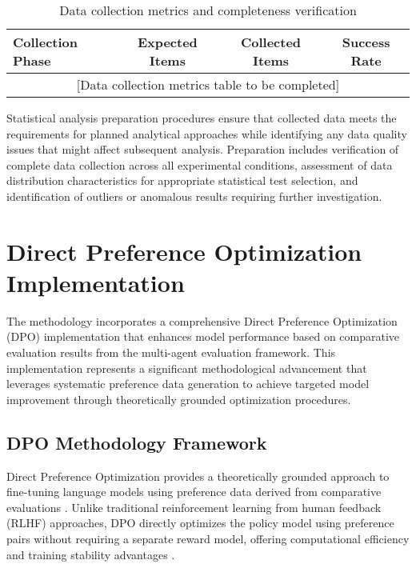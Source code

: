 \begin{table}[htbp]
    \centering
    \caption{Data collection metrics and completeness verification}
    \label{tab:data-collection-metrics}
    \begin{tabular}{|l|c|c|c|}
    \hline
    \textbf{Collection Phase} & \textbf{Expected Items} & \textbf{Collected Items} & \textbf{Success Rate} \\
    \hline
    \multicolumn{4}{|c|}{[Data collection metrics table to be completed]} \\
    \hline
    \end{tabular}
\end{table}

Statistical analysis preparation procedures ensure that collected data meets the requirements for planned analytical approaches while identifying any data quality issues that might affect subsequent analysis. Preparation includes verification of complete data collection across all experimental conditions, assessment of data distribution characteristics for appropriate statistical test selection, and identification of outliers or anomalous results requiring further investigation.

\section{Direct Preference Optimization Implementation}
\label{sec:dpo-implementation}

The methodology incorporates a comprehensive Direct Preference Optimization (DPO) implementation that enhances model performance based on comparative evaluation results from the multi-agent evaluation framework. This implementation represents a significant methodological advancement that leverages systematic preference data generation to achieve targeted model improvement through theoretically grounded optimization procedures.

\subsection{DPO Methodology Framework}

Direct Preference Optimization provides a theoretically grounded approach to fine-tuning language models using preference data derived from comparative evaluations \cite{rafailov2023dpo, muldrew2024active_preference}. Unlike traditional reinforcement learning from human feedback (RLHF) approaches, DPO directly optimizes the policy model using preference pairs without requiring a separate reward model, offering computational efficiency and training stability advantages \cite{wang2024asft}.

